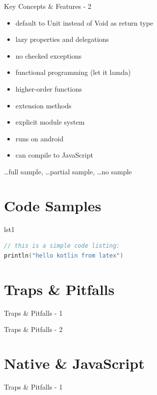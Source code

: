 \begin{frame}{Key Concepts \& Features - 2}
	\begin{itemize}
		\item default to Unit instead of Void as return type \xmark 
		\item lazy properties and delegations \cmark
		\item no checked exceptions \xmark
		\item functional programming (let it lamda) \tmark
		\item higher-order functions \tmark
		\item extension methods \cmark
		\item explicit module system \xmark
		\item runs on android \xmark
		\item can compile to JavaScript \xmark
	\end{itemize}
\cmark \dots full sample, \tmark \dots partial sample, \xmark \dots no sample
\end{frame}

\section{Code Samples}

\begin{frame}[fragile]{lst1}
\begin{lstlisting}[caption={Simple code listing.}, label={lst:example1}, language=Kotlin]
// this is a simple code listing:
println("hello kotlin from latex")
\end{lstlisting}
\end{frame}

\section{Traps \& Pitfalls}

\begin{frame}{Traps \& Pitfalls - 1}
\end{frame}

\begin{frame}{Traps \& Pitfalls - 2}
\end{frame}

\section{Native \& JavaScript}

\begin{frame}{Traps \& Pitfalls - 1}
\end{frame}

